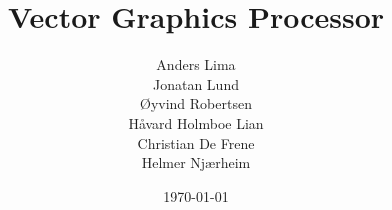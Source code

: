 \newcommand{\mytitle}{Vector Graphics Processor}
\newcommand{\myauthor}{Anders Lima\\Jonatan Lund\\Øyvind Robertsen\\Håvard Holmboe Lian\\Christian De Frene\\Helmer Njærheim}

\title{\mytitle}
\author{\myauthor}
\date{\today}
